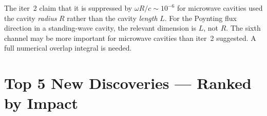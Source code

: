 \documentclass[11pt]{article}
\theoremstyle{definition}
\theoremstyle{remark}
\begin{document}
The iter~2 claim that it is suppressed by $\omega R/c \sim 10^{-6}$
for microwave cavities used the cavity \emph{radius} $R$ rather than
the cavity \emph{length} $L$. For the Poynting flux direction in a
standing-wave cavity, the relevant dimension is $L$, not $R$.
The sixth channel may be more important for microwave cavities than
iter~2 suggested. A full numerical overlap integral is needed.


\section{Top 5 New Discoveries --- Ranked by Impact}
\label{sec:top5}
\end{document}
